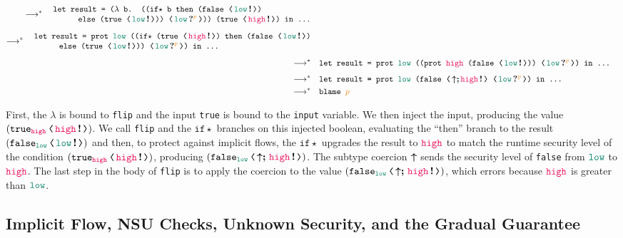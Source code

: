 {\small
  \begin{align*}
    \longrightarrow^{*}
    \begin{split}
      &\quad \texttt{let result = ($\lambda$ b. ((if${\star}$ b then (false ⟨\,\inj{\low}\,⟩)} \\[-3pt]
      &\quad\quad\qquad\texttt{else (true ⟨\,\inj{\low}\,⟩)) ⟨\,\proj{\low}{p}\,⟩)) (true ⟨\,\inj{\high}\,⟩) in ...}
    \end{split} \\[1ex]
    \longrightarrow^{*}
    \begin{split}
      &\quad \texttt{let result = prot \low ((if${\star}$ (true ⟨\,\inj{\high}\,⟩) then (false ⟨\,\inj{\low}\,⟩)} \\[-3pt]
      &\quad\quad\qquad\texttt{else (true ⟨\,\inj{\low}\,⟩)) ⟨\,\proj{\low}{p}\,⟩) in ...}
    \end{split}\\[1ex]
    \longrightarrow^{*} &
    \quad \texttt{let result = prot \low ((prot \high (false ⟨\,\inj{\low}\,⟩)) ⟨\,\proj{\low}{p}\,⟩) in ...} \\[1ex]
    \longrightarrow^{*} &
    \quad\texttt{let result = prot \low (false ⟨\,\up\seq\inj{\high}\,⟩ ⟨\,\proj{\low}{p}\,⟩) in ...} \\
    \longrightarrow^{*} &
    \quad\texttt{blame \bl{p}}
\end{align*}}

First, the $\lambda$ is bound to \texttt{flip} and the input \texttt{true} is
bound to the \texttt{input} variable. We then inject the input, producing the
value $(\cccast{\true_{\high}}{\inj{\high}})$. We call \texttt{flip} and the
$\mathtt{if}\star$ branches on this injected boolean, evaluating the ``then''
branch to the result $(\cccast{\false_{\low}}{\inj{\low}})$ and then, to protect
against implicit flows, the $\mathtt{if}\star$ upgrades the result to $\high$ to
match the runtime security level of the condition
$(\cccast{\true_{\high}}{\inj{\high}})$, producing
$(\cccast{\false_{\low}}{\up\seq\inj{\high}})$. The subtype coercion $\boldsymbol{\uparrow}$ sends
the security level of \texttt{false} from $\low$ to $\high$. The last step in
the body of \texttt{flip} is to apply the coercion \texttt{} to
the value $(\cccast{\false_{\low}}{\up\seq\inj{\high}})$, which errors because
$\high$ is greater than $\low$.

\subsection{Implicit Flow, NSU Checks, Unknown Security, and the Gradual Guarantee}
\label{sec:example2}

